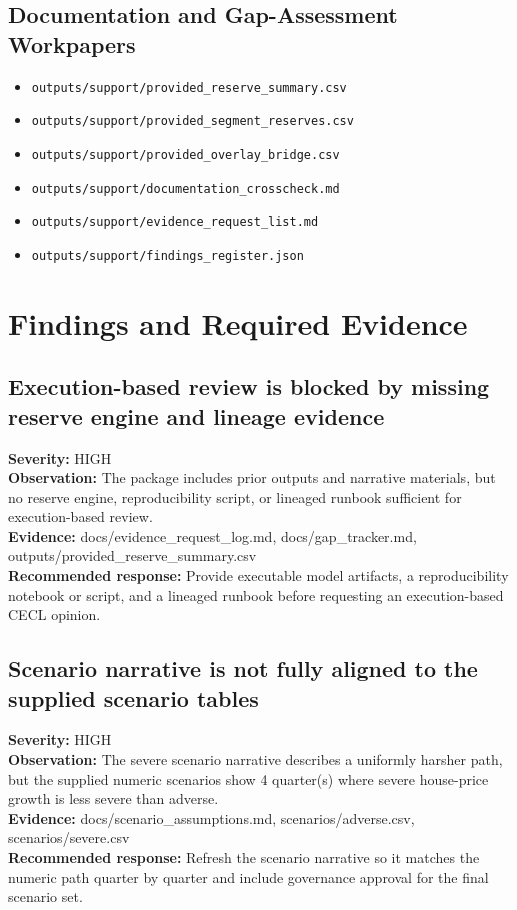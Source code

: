 \documentclass[11pt]{article}
\begin{document}
\subsection*{Documentation and Gap-Assessment Workpapers}
\begin{itemize}
\item \texttt{outputs/support/provided\_reserve\_summary.csv}
\item \texttt{outputs/support/provided\_segment\_reserves.csv}
\item \texttt{outputs/support/provided\_overlay\_bridge.csv}
\item \texttt{outputs/support/documentation\_crosscheck.md}
\item \texttt{outputs/support/evidence\_request\_list.md}
\item \texttt{outputs/support/findings\_register.json}
\end{itemize}
\section*{Findings and Required Evidence}
\subsection*{Execution-based review is blocked by missing reserve engine and lineage evidence}
\textbf{Severity:} HIGH\\
\textbf{Observation:} The package includes prior outputs and narrative materials, but no reserve engine, reproducibility script, or lineaged runbook sufficient for execution-based review.\\
\textbf{Evidence:} docs/evidence\_request\_log.md, docs/gap\_tracker.md, outputs/provided\_reserve\_summary.csv\\
\textbf{Recommended response:} Provide executable model artifacts, a reproducibility notebook or script, and a lineaged runbook before requesting an execution-based CECL opinion.
\subsection*{Scenario narrative is not fully aligned to the supplied scenario tables}
\textbf{Severity:} HIGH\\
\textbf{Observation:} The severe scenario narrative describes a uniformly harsher path, but the supplied numeric scenarios show 4 quarter(s) where severe house-price growth is less severe than adverse.\\
\textbf{Evidence:} docs/scenario\_assumptions.md, scenarios/adverse.csv, scenarios/severe.csv\\
\textbf{Recommended response:} Refresh the scenario narrative so it matches the numeric path quarter by quarter and include governance approval for the final scenario set.
\end{document}
